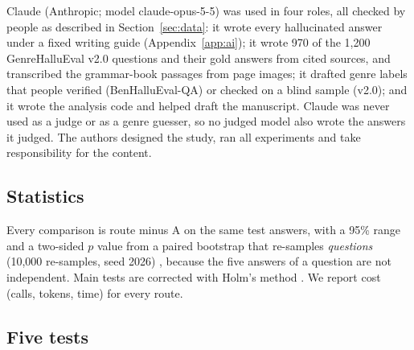 \documentclass[pdflatex,sn-apa]{sn-jnl}
\begin{document}
Claude (Anthropic; model claude-opus-5-5) was used in four roles, all checked by people as described in
Section~\ref{sec:data}: it wrote every hallucinated answer under a fixed writing guide (Appendix~\ref{app:ai}); it wrote
970 of the 1,200 GenreHalluEval v2.0 questions and their gold answers from cited sources, and transcribed the
grammar-book passages from page images; it drafted genre labels that people verified (BenHalluEval-QA) or checked on a
blind sample (v2.0); and it wrote the analysis code and helped draft the manuscript. Claude was never used as a judge or
as a genre guesser, so no judged model also wrote the answers it judged. The authors designed the study, ran all
experiments and take responsibility for the content.

\subsection{Statistics}

Every comparison is route minus A on the same test answers, with a 95\% range and a two-sided $p$ value from a paired
bootstrap that re-samples \emph{questions} (10,000 re-samples, seed 2026) \citep{efron1979}, because the five answers
of a question are not independent. Main tests are corrected with Holm's method \citep{holm1979}. We report cost
(calls, tokens, time) for every route.

\subsection{Five tests}
\end{document}
